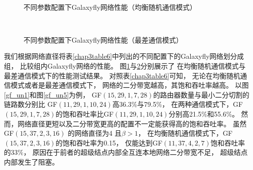 \begin{figure}[t]
  \centering
  \begin{minipage}[t]{\textwidth}
    \centering
    \subfloat[网络直径$D=2$]{
      \texttt{[image: gf\_ur\_a]}
      \label{gf_un1}
    }
    \subfloat[网络直径$D=3$]{
      \texttt{[image: gf\_ur\_b]}
      \label{gf_un2}
    }
    \\
    \subfloat[网络直径$D=4$]{
      \texttt{[image: gf\_ur\_c]}
      \label{gf_un3}
    }
    \subfloat[网络直径$D=5$]{
      \texttt{[image: gf\_ur\_d]}
      \label{gf_un4}
    }
    \caption{不同参数配置下Galaxyfly网络性能（均衡随机通信模式）}
    \label{chap3figure10a}
  \end{minipage}
\end{figure}
\begin{figure}
  \centering
  \begin{minipage}[t]{\textwidth}
    \centering
    \subfloat[网络直径$D=2$]{
      \texttt{[image: gf\_w\_a]}
      \label{gf_un5}
    }
    \subfloat[网络直径$D=3$]{
      \texttt{[image: gf\_w\_b]}
      \label{gf_un6}
    }
    \\
    \subfloat[网络直径$D=4$]{
      \texttt{[image: gf\_w\_c]}
      \label{gf_un7}
    }
    \subfloat[网络直径$D=5$]{
      \texttt{[image: gf\_w\_d]}
      \label{gf_un8}
    }
    \caption{不同参数配置下Galaxyfly网络性能（最差通信模式）}
    \label{chap3figure10b}
  \end{minipage}
\end{figure}

我们根据网络直径将表\ref{chap3table6}中列出的不同配置下的Galaxyfly网络划分成组，
比较组内Galaxyfly网络的性能。
图\ref{chap3figure10a}与\ref{chap3figure10b}分别展示了
在均衡随机通信模式与最差通信模式下的性能测试结果。
对照表\ref{chap3table6}可知，
无论在均衡随机通信模式或者是最差通信模式下，
网络的二分带宽越高，其饱和吞吐率越高。
以图\ref{gf_un1}和图\ref{gf_un5}为例，
GF$(15,29,1,7,28)$的路由器数量与最小二分切割的链路数分别比
GF$(11,29,1,10,24)$高36.3\%与79.5\%，
在两种通信模式下，GF$(15,29,1,7,28)$的饱和吞吐率比GF$(11,29,1,10,24)$分别高21.5\%和55.6\%。
然而，网络直径更短以及二分带宽更高的配置不一定能获得高的饱和吞吐率。
虽然GF$(15,37,2,3,16)$ 的网络直径为4 且$\beta>1$，
在均衡随机通信模式下，GF$(15,37,2,3,16)$的饱和吞吐率为0.15，
仅能达到GF$(11,37,4,2,7)$饱和吞吐率的33\%，
原因在于前者的超级结点内部全互连本地网络二分带宽不足，
超级结点内部发生了阻塞。

